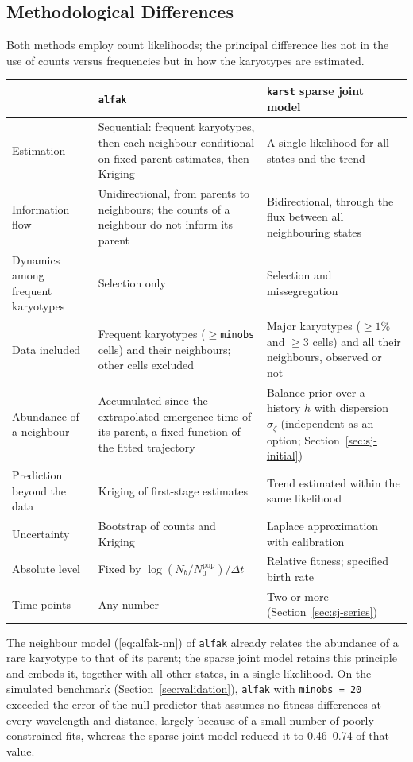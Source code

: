 \documentclass[11pt]{article}
\begin{document}
\subsection{Methodological Differences}

Both methods employ count likelihoods; the principal difference lies not in
the use of counts versus frequencies but in how the karyotypes are estimated.

\begin{center}
\begin{tabular}{L{0.2\textwidth}L{0.35\textwidth}L{0.35\textwidth}}
\toprule
 & \texttt{alfak} & \texttt{karst} sparse joint model \\
\midrule
Estimation & Sequential: frequent karyotypes, then each neighbour
conditional on fixed parent estimates, then Kriging & A single likelihood for
all states and the trend \\
Information flow & Unidirectional, from parents to neighbours; the counts of a
neighbour do not inform its parent & Bidirectional, through the flux between
all neighbouring states \\
Dynamics among frequent karyotypes & Selection only & Selection and
missegregation \\
Data included & Frequent karyotypes ($\ge$\texttt{minobs} cells) and their
neighbours; other cells excluded & Major karyotypes ($\ge1\%$ and $\ge3$
cells) and all their neighbours, observed or not \\
Abundance of a neighbour & Accumulated since the extrapolated emergence time
of its parent, a fixed function of the fitted trajectory & Balance prior over
a history $h$ with dispersion $\sigma_\zeta$ (independent as an option;
Section~\ref{sec:sj-initial}) \\
Prediction beyond the data & Kriging of first-stage estimates & Trend
estimated within the same likelihood \\
Uncertainty & Bootstrap of counts and Kriging & Laplace approximation with
calibration \\
Absolute level & Fixed by $\log(N_b/N_0^{\mathrm{pop}})/\Delta t$ & Relative
fitness; specified birth rate \\
Time points & Any number & Two or more (Section~\ref{sec:sj-series}) \\
\bottomrule
\end{tabular}
\end{center}

The neighbour model (\ref{eq:alfak-nn}) of \texttt{alfak} already relates
the abundance of a rare karyotype to that of its parent; the sparse joint
model retains this principle and embeds it, together with all other states,
in a single likelihood. On the simulated benchmark (Section~\ref{sec:validation}),
\texttt{alfak} with \texttt{minobs = 20} exceeded the error of the null
predictor that assumes no fitness differences at every wavelength and
distance, largely because of a small number of poorly constrained fits,
whereas the sparse joint model reduced it to 0.46--0.74 of that value.
\end{document}
